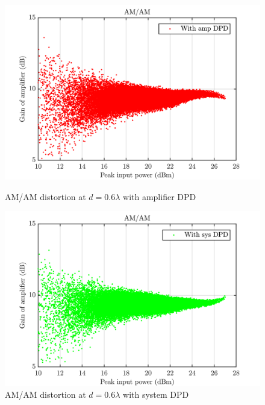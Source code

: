 \begin{figure}[H]
  \centering
  \begin{minipage}[b]{0.5\textwidth}
	\includegraphics[scale = 0.5]{figures/measurement/cree/meas3/amam_amp_dpd_0p6.png}
	\caption{AM/AM distortion at $d = 0.6\lambda$ with amplifier DPD}	
    \label{fig:meas3_amam5_3}
  \end{minipage}
  \hfill
  \begin{minipage}[b]{0.4\textwidth}
	\includegraphics[scale = 0.5]{figures/measurement/cree/meas3/amam_sys_dpd_0p6.png}
	\caption{AM/AM distortion at $d = 0.6\lambda$ with system DPD}
    \label{fig:meas3_amam6_3}
  \end{minipage}
\end{figure}

